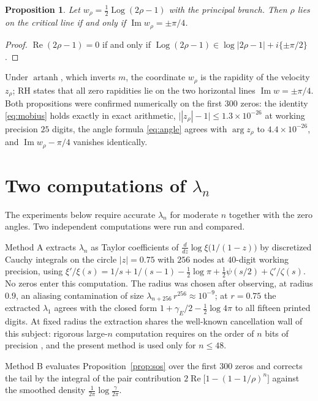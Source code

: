 \documentclass[11pt,oneside]{article}
\newtheorem{proposition}{Proposition}[section]
\theoremstyle{remark}
\newcommand{\re}{\operatorname{Re}}
\newcommand{\im}{\operatorname{Im}}
\begin{document}
\begin{samepage}
\begin{proposition}\label{prop:rapidity}
Let $w_\rho = \tfrac12 \operatorname{Log}(2\rho - 1)$ with the principal branch.
Then $\rho$ lies on the critical line if and only if
$\im w_\rho = \pm\pi/4$.
\end{proposition}
\begin{proof}
$\re(2\rho - 1) = 0$ if and only if $\operatorname{Log}(2\rho-1) \in
\log|2\rho-1| + i\{\pm\pi/2\}$.
\end{proof}
\end{samepage}

Under $\operatorname{artanh}$, which inverts $m$, the coordinate $w_\rho$ is
the rapidity of the velocity $z_\rho$; RH states that all zero rapidities lie
on the two horizontal lines $\im w = \pm \pi/4$. Both propositions were
confirmed numerically on the first $300$ zeros: the identity \eqref{eq:mobius}
holds exactly in exact arithmetic, $\bigl||z_\rho| - 1\bigr| \le 1.3\times
10^{-26}$ at working precision $25$ digits, the angle formula \eqref{eq:angle}
agrees with $\arg z_\rho$ to $4.4 \times 10^{-26}$, and
$\im w_\rho - \pi/4$ vanishes identically.

\section{Two computations of $\lambda_n$}\label{sec:lambda}

The experiments below require accurate $\lambda_n$ for moderate $n$ together
with the zero angles. Two independent computations were run and compared.

Method A extracts $\lambda_{n}$ as Taylor coefficients of
$\frac{d}{dz}\log\xi\bigl(1/(1-z)\bigr)$ by discretized Cauchy integrals on the
circle $|z| = 0.75$ with $256$ nodes at $40$-digit working precision, using
$\xi'/\xi(s) = 1/s + 1/(s-1) - \tfrac12\log\pi + \tfrac12\psi(s/2) +
\zeta'/\zeta(s)$. No zeros enter this computation. The radius was chosen after
observing, at radius $0.9$, an aliasing contamination of size
$\lambda_{n+256}\,r^{256} \approx 10^{-9}$; at $r = 0.75$ the extracted
$\lambda_1$ agrees with the closed form $1 + \gamma_E/2 - \tfrac12\log 4\pi$ to
all fifteen printed digits. At fixed radius the extraction shares the
well-known cancellation wall of this subject: rigorous large-$n$ computation
requires on the order of $n$ bits of precision \cite{Johansson}, and the
present method is used only for $n \le 48$.

Method B evaluates Proposition~\ref{prop:sos} over the first $300$ zeros and
corrects the tail by the integral of the pair contribution
$2\re\bigl[1 - (1 - 1/\rho)^n\bigr]$ against the smoothed density
$\frac{1}{2\pi}\log\frac{\gamma}{2\pi}$.
\end{document}

